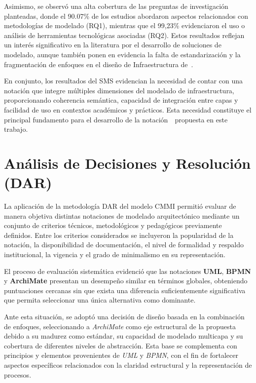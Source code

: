 Asimismo, se observó una alta cobertura de las preguntas de investigación planteadas, donde el 90.07\% de los estudios abordaron aspectos relacionados con metodologías de modelado (RQ1), mientras que el 99,23\% evidenciaron el uso o análisis de herramientas tecnológicas asociadas (RQ2). Estos resultados reflejan un interés significativo en la literatura por el desarrollo de soluciones de modelado, aunque también ponen en evidencia la falta de estandarización y la fragmentación de enfoques en el diseño de Infraestructura de~\TI.

En conjunto, los resultados del SMS evidencian la necesidad de contar con una notación que integre múltiples dimensiones del modelado de infraestructura, proporcionando coherencia semántica, capacidad de integración entre capas y facilidad de uso en contextos académicos y prácticos. Esta necesidad constituye el principal fundamento para el desarrollo de la notación~\NDITI~propuesta en este trabajo.

\section{Análisis de Decisiones y Resolución (DAR)}
\noindent

La aplicación de la metodología DAR del modelo CMMI permitió evaluar de manera objetiva distintas notaciones de modelado arquitectónico mediante un conjunto de criterios técnicos, metodológicos y pedagógicos previamente definidos. Entre los criterios considerados se incluyeron la popularidad de la notación, la disponibilidad de documentación, el nivel de formalidad y respaldo institucional, la vigencia y el grado de minimalismo en su representación.

El proceso de evaluación sistemática evidenció que las notaciones \textbf{UML}, \textbf{BPMN} y \textbf{ArchiMate} presentan un desempeño similar en términos globales, obteniendo puntuaciones cercanas sin que exista una diferencia suficientemente significativa que permita seleccionar una única alternativa como dominante.

Ante esta situación, se adoptó una decisión de diseño basada en la combinación de enfoques, seleccionando a \textit{ArchiMate} como eje estructural de la propuesta debido a su madurez como estándar, su capacidad de modelado multicapa y su cobertura de diferentes niveles de abstracción. Esta base se complementa con principios y elementos provenientes de \textit{UML} y \textit{BPMN}, con el fin de fortalecer aspectos específicos relacionados con la claridad estructural y la representación de procesos.

